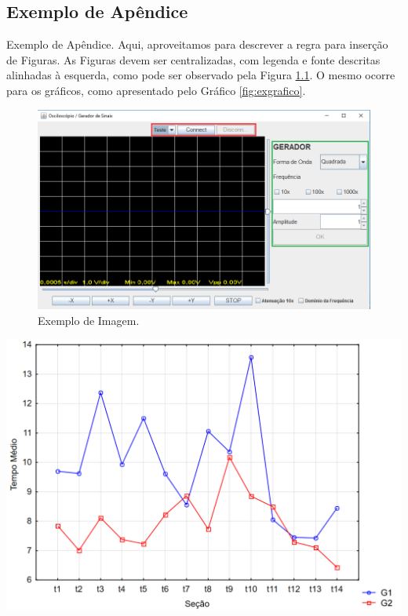 \begin{apendicesenv}

\chapter{Exemplo de Apêndice}
\label{cap:apendice}

    Exemplo de Apêndice. Aqui, aproveitamos para descrever a regra para inserção de Figuras. As Figuras devem ser centralizadas, com legenda e fonte descritas alinhadas à esquerda, como pode ser observado pela Figura \ref{fig:exemplo}. O mesmo ocorre para os gráficos, como apresentado pelo Gráfico \ref{fig:exgrafico}. 
    
    \begin{figure}[h]
        \caption{Exemplo de Imagem.}
        \begin{center}
            \includegraphics[width=0.6\linewidth]{Imagens/Tela.png}
        \end{center}
        \label{fig:exemplo}
    \end{figure}
    
    \begin{grafico}[h]
        \caption{Exemplo de Gráfico.}
        \begin{center}
            \includegraphics[width=0.6\linewidth]{Imagens/grafico.png}
        \end{center}
        \label{fig:exgrafico}
    \end{grafico}


\end{apendicesenv}
